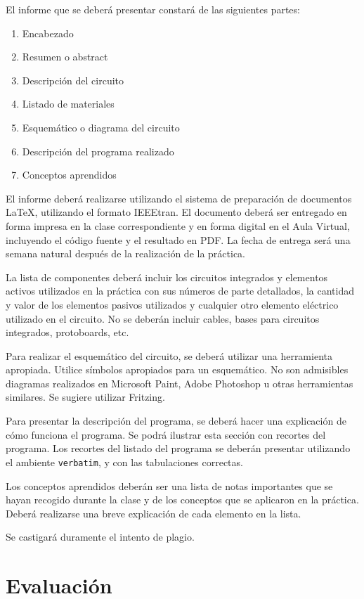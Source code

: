 \documentclass[12pt,letterpaper]{IEEEtran}
\begin{document}
El informe que se deberá presentar constará de las siguientes partes:

\begin{enumerate}
  \item Encabezado
  \item Resumen o abstract
  \item Descripción del circuito
  \item Listado de materiales
  \item Esquemático o diagrama del circuito
  \item Descripción del programa realizado
  \item Conceptos aprendidos
\end{enumerate}

El informe deberá realizarse utilizando el sistema de preparación de documentos \LaTeX, utilizando el formato IEEEtran. El documento deberá ser entregado en forma impresa en la clase correspondiente y en forma digital en el Aula Virtual, incluyendo el código fuente y el resultado en PDF.  La fecha de entrega será una semana natural después de la realización de la práctica.

La lista de componentes deberá incluir los circuitos integrados y elementos activos utilizados en la práctica con sus números de parte detallados, la cantidad y valor de los elementos pasivos utilizados y cualquier otro elemento eléctrico utilizado en el circuito. No se deberán incluir cables, bases para circuitos integrados, protoboards, etc.

Para realizar el esquemático del circuito, se deberá utilizar una herramienta apropiada. Utilice símbolos apropiados para un esquemático. No son admisibles diagramas realizados en Microsoft Paint, Adobe Photoshop u otras herramientas similares. Se sugiere utilizar Fritzing.

Para presentar la descripción del programa, se deberá hacer una explicación de cómo funciona el programa. Se podrá ilustrar esta sección con recortes del programa. Los recortes del listado del programa se deberán presentar utilizando el ambiente \texttt{verbatim}, y con las tabulaciones correctas. 

Los conceptos aprendidos deberán ser una lista de notas importantes que se hayan recogido durante la clase y de los conceptos que se aplicaron en la práctica. Deberá realizarse una breve explicación de cada elemento en la lista.

Se castigará duramente el intento de plagio.
\newpage
\section{Evaluación}
\end{document}
